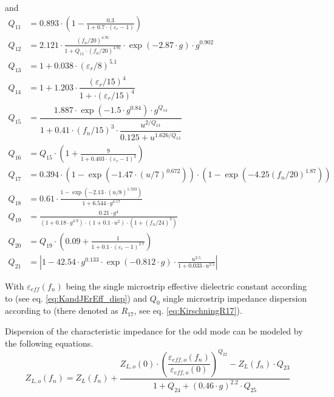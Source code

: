 and
\begin{align}
Q_{11} &= 0.893\cdot \left( 1 - \frac{0.3}{1+0.7\cdot\left(\varepsilon_r-1\right)} \right)\\
Q_{12} &= 2.121\cdot \frac{\left( f_n/20\right) ^{4.91}}
                         {1+Q_{11}\cdot\left( f_n/20\right) ^{4.91}}
	      \cdot \exp\left(-2.87\cdot g\right)\cdot g^{0.902}\\
Q_{13} &= 1 + 0.038\cdot \left( \varepsilon_r/8 \right) ^{5.1}\\
Q_{14} &= 1 + 1.203\cdot \dfrac{ \left( \varepsilon_r/15 \right) ^4}
                             {1 + \cdot \left( \varepsilon_r/15 \right) ^4}\\
Q_{15} &= \dfrac{ 1.887\cdot \exp\left(-1.5\cdot g^{0.84}\right)\cdot g^{Q_{14}} }
              { 1 + 0.41\cdot \left( f_n/15 \right) ^3 \cdot
	        \dfrac{u^{2/Q_{13}}}{0.125 + u^{1.626/Q_{13}}}}\\
Q_{16} &= Q_{15}\cdot \left( 1 + \frac{9}{1+0.403\cdot \left(\varepsilon_r-1\right)^2} \right)\\
Q_{17} &= 0.394\cdot \left( 1-\exp\left( -1.47\cdot\left( u/7 \right) ^{0.672} \right) \right)
        \cdot \left( 1-\exp\left( -4.25\left( f_n/20 \right) ^{1.87} \right) \right)\\
Q_{18} &= 0.61\cdot\frac{1-\exp\left( -2.13\cdot\left( u/8 \right) ^{1.593} \right)}
                  {1+6.544\cdot g^{4.17}}\\
Q_{19} &= \frac{ 0.21\cdot g^4 }{\left(1+0.18\cdot g^{4.9}\right)\cdot \left(1+0.1\cdot u^2\right) \cdot
                \left( 1+\left( f_n/24 \right) ^3 \right)}\\
Q_{20} &= Q_{19}\cdot \left( 0.09 + \frac{1}{1+0.1\cdot \left(\varepsilon_r-1\right)^{2.7}} \right)\\
Q_{21} &= \left| 1-42.54\cdot g^{0.133}\cdot \exp\left(-0.812\cdot g\right)
                   \cdot\frac{u^{2.5}}{1+0.033\cdot u^{2.5}} \right|
\end{align}

With $\varepsilon_{eff}(f_n)$ being the single microstrip effective
dielectric constant according to \cite{Kirschning3} (see eq.
\eqref{eq:KandJErEff_disp}) and $Q_0$ single microstrip impedance
dispersion according to \cite{Kirschning1} (there denoted as $R_{17}$,
see eq. \eqref{eq:KirschningR17}).

\addvspace{12pt}

Dispersion of the characteristic impedance for the odd mode can be
modeled by the following equations.
\begin{equation}
Z_{L,o}(f_n) = Z_L(f_n) + \dfrac{ Z_{L,o}(0)\cdot
               \left( \dfrac{\varepsilon_{eff,o}(f_n)}{\varepsilon_{eff,o}(0)} \right) ^{Q_{22}}
	     - Z_L(f_n)\cdot Q_{23} }{ 1+Q_{24}+\left(0.46\cdot g\right)^{2.2} \cdot Q_{25} }
\end{equation}

